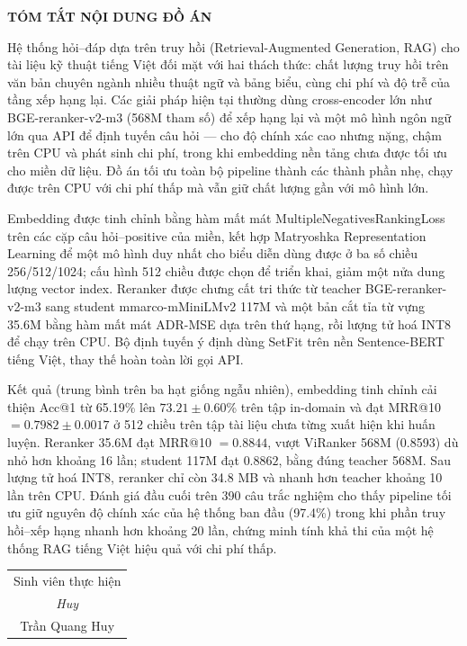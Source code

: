 \documentclass[../DoAn.tex]{subfiles}
\begin{document}
\begin{center}
    \Large{\textbf{TÓM TẮT NỘI DUNG ĐỒ ÁN}}\\
\end{center}
\vspace{0.5cm}

Hệ thống hỏi--đáp dựa trên truy hồi (Retrieval-Augmented Generation, RAG) cho tài liệu kỹ thuật tiếng Việt đối mặt với hai thách thức: chất lượng truy hồi trên văn bản chuyên ngành nhiều thuật ngữ và bảng biểu, cùng chi phí và độ trễ của tầng xếp hạng lại. Các giải pháp hiện tại thường dùng cross-encoder lớn như BGE-reranker-v2-m3 (568M tham số) để xếp hạng lại và một mô hình ngôn ngữ lớn qua API để định tuyến câu hỏi --- cho độ chính xác cao nhưng nặng, chậm trên CPU và phát sinh chi phí, trong khi embedding nền tảng chưa được tối ưu cho miền dữ liệu. Đồ án tối ưu toàn bộ pipeline thành các thành phần nhẹ, chạy được trên CPU với chi phí thấp mà vẫn giữ chất lượng gần với mô hình lớn.

Embedding  được tinh chỉnh bằng hàm mất mát MultipleNegativesRankingLoss trên các cặp câu hỏi--positive của miền, kết hợp Matryoshka Representation Learning để một mô hình duy nhất cho biểu diễn dùng được ở ba số chiều 256/512/1024; cấu hình 512 chiều được chọn để triển khai, giảm một nửa dung lượng vector index. Reranker được chưng cất tri thức từ teacher BGE-reranker-v2-m3 sang student mmarco-mMiniLMv2 117M và một bản cắt tỉa từ vựng 35.6M bằng hàm mất mát ADR-MSE dựa trên thứ hạng, rồi lượng tử hoá INT8 để chạy trên CPU. Bộ định tuyến ý định dùng SetFit trên nền Sentence-BERT tiếng Việt, thay thế hoàn toàn lời gọi API.

Kết quả (trung bình trên ba hạt giống ngẫu nhiên), embedding tinh chỉnh cải thiện Acc@1 từ 65.19\% lên $73.21 \pm 0.60$\% trên tập in-domain và đạt MRR@10 $= 0.7982 \pm 0.0017$ ở 512 chiều trên tập tài liệu chưa từng xuất hiện khi huấn luyện. Reranker 35.6M đạt MRR@10 $= 0.8844$, vượt ViRanker 568M (0.8593) dù nhỏ hơn khoảng 16 lần; student 117M đạt $0.8862$, bằng đúng teacher 568M. Sau lượng tử hoá INT8, reranker chỉ còn 34.8 MB và nhanh hơn teacher khoảng 10 lần trên CPU. Đánh giá đầu cuối trên 390 câu trắc nghiệm cho thấy pipeline tối ưu giữ nguyên độ chính xác của hệ thống ban đầu (97.4\%) trong khi phần truy hồi--xếp hạng nhanh hơn khoảng 20 lần, chứng minh tính khả thi của một hệ thống RAG tiếng Việt hiệu quả với chi phí thấp.

\begin{flushright}
\begin{tabular}{c}
Sinh viên thực hiện\\[0.2cm]
\textit{Huy}\\
Trần Quang Huy
\end{tabular}
\end{flushright}
\end{document}
